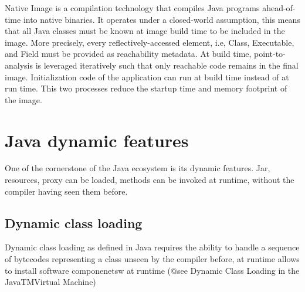 Native Image\cite{noauthor_native_nodate, noauthor_native_nodate-1, wimmer_initialize_2019} is a compilation technology that compiles Java programs ahead-of-time into native binaries. It operates under a closed-world assumption, this means that all Java classes must be known at image build time to be included in the image. 
More precisely, every reflectively-accessed element, i.e, Class, Executable, and Field must be provided as reachability metadata. 
At build time, point-to-analysis is leveraged iteratively such that only reachable code remains in the final image. Initialization code of the application can run at build time instead of at run time. This two processes
reduce the startup time and memory footprint of the image.



\section{Java dynamic features}
One of the cornerstone of the Java ecosystem is its dynamic features. Jar, resources, proxy can be loaded, methods can be invoked at runtime, without the compiler having seen them before. 

\subsection{Dynamic class loading}
Dynamic class loading as defined in Java requires the ability to handle a sequence of bytecodes representing a class unseen by the compiler before, at runtime allows to install software componenetsw at runtime (@see Dynamic Class Loading in the JavaTMVirtual Machine)

